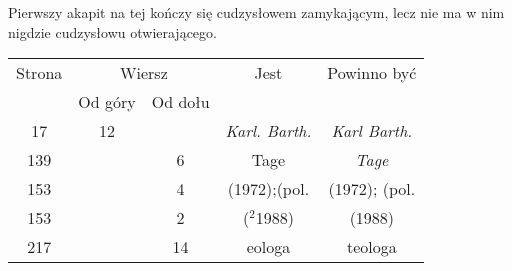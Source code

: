 \documentclass[a4paper,11pt]{article}
\begin{document}










\newpage


\vspace{0em}



\vspace{0em}


\noindent
{} Pierwszy akapit na tej kończy się cudzysłowem zamykającym, lecz
nie ma w nim nigdzie cudzysłowu otwierającego.







\vspace{\spaceFive}


\begin{center}

  \begin{tabular}{|c|c|c|c|c|}
    \hline
    Strona & \multicolumn{2}{c|}{Wiersz} & Jest
                              & Powinno być \\ \cline{2-3}
    & Od góry & Od dołu & & \\
    \hline
    17  & 12 & & \textit{Karl. Barth.} & \textit{Karl Barth.} \\
    139 & &  6 & Tage & \textit{Tage} \\
    153 & &  4 & (1972);(pol. & (1972); (pol. \\
    153 & &  2 & ($^{ 2 }$1988) & (1988) \\
    217 & & 14 & eologa & teologa \\
    \hline
  \end{tabular}

\end{center}
\end{document}
